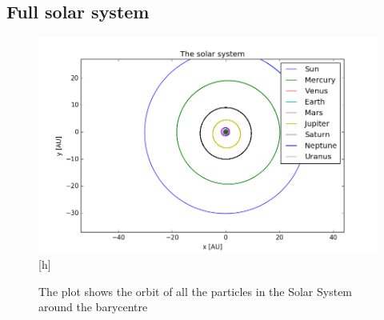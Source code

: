 \subsection{Full solar system}
\begin{figure}[h]
\includegraphics[width=\textwidth]{figures/solarsystem}[h]
\caption{The plot shows the orbit of all the particles in the Solar System around the barycentre}
\end{figure}

